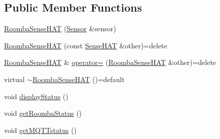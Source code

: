\subsection*{Public Member Functions}
\begin{DoxyCompactItemize}
\item 
\hyperlink{class_roomba_sense_h_a_t_a72dcec927c5b2274a39789e0274cc0fd}{Roomba\+Sense\+H\+AT} (\hyperlink{class_sensor}{Sensor} \&sensor)
\item 
\hyperlink{class_roomba_sense_h_a_t_a51bc74e91051739c83f3b79e574f8b58}{Roomba\+Sense\+H\+AT} (const \hyperlink{class_sense_h_a_t}{Sense\+H\+AT} \&other)=delete
\item 
\hyperlink{class_roomba_sense_h_a_t}{Roomba\+Sense\+H\+AT} \& \hyperlink{class_roomba_sense_h_a_t_a55718c0f738b82c383083ece3b026930}{operator=} (\hyperlink{class_roomba_sense_h_a_t}{Roomba\+Sense\+H\+AT} \&other)=delete
\item 
virtual \hyperlink{class_roomba_sense_h_a_t_a1c63fdac14092128d6918f7bfaa8c711}{$\sim$\+Roomba\+Sense\+H\+AT} ()=default
\item 
void \hyperlink{class_roomba_sense_h_a_t_ad818e7105b0e47a88f93963edea85474}{display\+Status} ()
\item 
void \hyperlink{class_roomba_sense_h_a_t_abadc74cb7f41e91ed7884bd3568ddb86}{get\+Roomba\+Status} ()
\item 
void \hyperlink{class_roomba_sense_h_a_t_a2b5e58a1b75b3e7008e3f21aa890f54a}{get\+M\+Q\+T\+Tstatus} ()
\end{DoxyCompactItemize}
